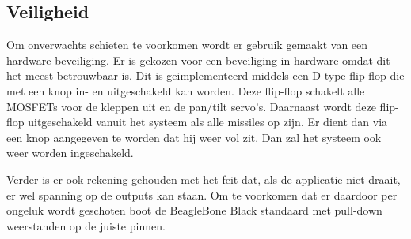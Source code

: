 \subsection{Veiligheid}

Om onverwachts schieten te voorkomen wordt er gebruik gemaakt van een hardware beveiliging.
Er is gekozen voor een beveiliging in hardware omdat dit het meest betrouwbaar is. Dit is
geimplementeerd middels een D-type flip-flop die met een knop in- en uitgeschakeld kan
worden. Deze flip-flop schakelt alle MOSFETs voor de kleppen uit en de pan/tilt servo's.
Daarnaast wordt deze flip-flop uitgeschakeld vanuit het systeem als alle missiles op zijn.
Er dient dan via een knop aangegeven te worden dat hij weer vol zit. Dan zal het systeem
ook weer worden ingeschakeld.

Verder is er ook rekening gehouden met het feit dat, als de applicatie niet draait, er wel
spanning op de outputs kan staan. Om te voorkomen dat er daardoor per ongeluk wordt geschoten
boot de BeagleBone Black standaard met pull-down weerstanden op de juiste pinnen.
